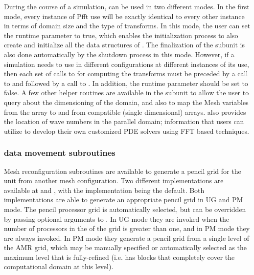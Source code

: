 During the course of a simulation,  can be used in two
different modes. In the first mode, every instance of Pfft use will be
exactly identical to every other instance in terms of domain size and
the type of transforms. In this mode, the user can set the runtime
parameter  to true, which enables the
 initialization process to also create and initialize all
the data structures of . The finalization of the
 subunit is also done automatically by the 
shutdown process in this mode. However, if a simulation needs to use
 in different configurations at different instances of its
use, then each set of calls to  for computing the
transforms must be preceded by a call to  and
followed by a call to . In addition, the
runtime parameter  should be set to false.  A
few other helper routines are available in the subunit to allow the
user to query  about the dimensioning of the domain, and
also to map the Mesh variables from the  array to and from
 compatible (single dimensional) arrays.   also
provides the location of wave numbers in the parallel domain;
information that users can utilize to develop their own customized PDE
solvers using FFT based techniques.

\subsubsection{ data movement subroutines}
\label{Sec:PFFTDataMove}
Mesh reconfiguration subroutines are available to generate a pencil
grid for the  unit from another mesh configuration.  Two different implementations are
available at
 and
,
with the  implementation being the default.  Both
implementations are able to generate an appropriate pencil grid in UG
and PM mode.  The pencil processor grid is automatically selected, but
can be overridden by passing optional arguments to
.  In UG mode they are invoked when the number of
processors in the  of the  grid is greater than one,
and in PM mode they are always invoked.  In PM mode they generate a
pencil grid from a single level of the AMR grid, which may be manually
specified or automatically selected as the maximum level that is
fully-refined (i.e. has blocks that completely cover the computational
domain at this level).

